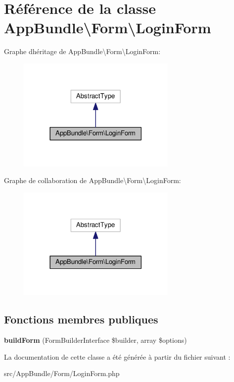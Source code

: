 \hypertarget{classAppBundle_1_1Form_1_1LoginForm}{}\section{Référence de la classe App\+Bundle\textbackslash{}Form\textbackslash{}Login\+Form}
\label{classAppBundle_1_1Form_1_1LoginForm}


Graphe d\textquotesingle{}héritage de App\+Bundle\textbackslash{}Form\textbackslash{}Login\+Form\+:\nopagebreak
\begin{figure}[H]
\begin{center}
\leavevmode
\includegraphics[width=218pt]{classAppBundle_1_1Form_1_1LoginForm__inherit__graph}
\end{center}
\end{figure}


Graphe de collaboration de App\+Bundle\textbackslash{}Form\textbackslash{}Login\+Form\+:\nopagebreak
\begin{figure}[H]
\begin{center}
\leavevmode
\includegraphics[width=218pt]{classAppBundle_1_1Form_1_1LoginForm__coll__graph}
\end{center}
\end{figure}
\subsection*{Fonctions membres publiques}
\begin{DoxyCompactItemize}
\item 
\mbox{\label{classAppBundle_1_1Form_1_1LoginForm_a84f92c4eaab99ce9eb1361f5fa7e4091}} 
{\bfseries build\+Form} (Form\+Builder\+Interface \$builder, array \$options)
\end{DoxyCompactItemize}


La documentation de cette classe a été générée à partir du fichier suivant \+:\begin{DoxyCompactItemize}
\item 
src/\+App\+Bundle/\+Form/Login\+Form.\+php\end{DoxyCompactItemize}
